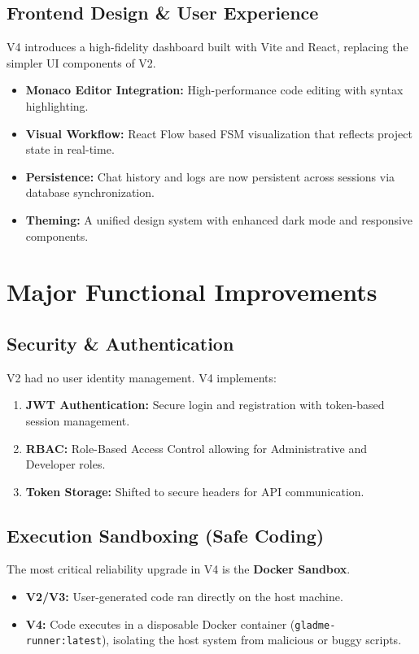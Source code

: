 \documentclass{article}
\begin{document}
\subsection{Frontend Design \& User Experience}
V4 introduces a high-fidelity dashboard built with Vite and React, replacing the simpler UI components of V2.

\begin{itemize}
    \item \textbf{Monaco Editor Integration:} High-performance code editing with syntax highlighting.
    \item \textbf{Visual Workflow:} React Flow based FSM visualization that reflects project state in real-time.
    \item \textbf{Persistence:} Chat history and logs are now persistent across sessions via database synchronization.
    \item \textbf{Theming:} A unified design system with enhanced dark mode and responsive components.
\end{itemize}

\section{Major Functional Improvements}

\subsection{Security & Authentication}
V2 had no user identity management. V4 implements:
\begin{enumerate}
    \item \textbf{JWT Authentication:} Secure login and registration with token-based session management.
    \item \textbf{RBAC:} Role-Based Access Control allowing for Administrative and Developer roles.
    \item \textbf{Token Storage:} Shifted to secure headers for API communication.
\end{enumerate}

\subsection{Execution Sandboxing (Safe Coding)}
The most critical reliability upgrade in V4 is the \textbf{Docker Sandbox}. 
\begin{itemize}
    \item \textbf{V2/V3:} User-generated code ran directly on the host machine.
    \item \textbf{V4:} Code executes in a disposable Docker container (\texttt{gladme-runner:latest}), isolating the host system from malicious or buggy scripts.
\end{itemize}
\end{document}
